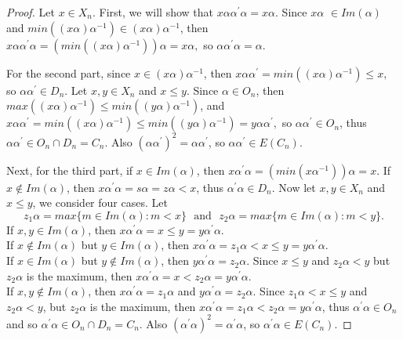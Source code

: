 \documentclass[10pt]{extarticle}
\numberwithin{equation}{section}
\numberwithin{bbb}{section}
\numberwithin{equation}{section}
\begin{document}
\begin{proof}
Let $x \in X_n$. First, we will show that $x\alpha\alpha^{\prime}\alpha=x\alpha$. Since $x\alpha$ $\in Im(\alpha)$ and $min((x\alpha)\alpha^{-1}) \in (x\alpha)\alpha^{-1}$, then
$x\alpha \alpha^{\prime}\alpha =(min((x\alpha)\alpha^{-1}))\alpha=x\alpha,$ so $\alpha \alpha^{\prime}\alpha=\alpha$.

\vspace{0.2cm}
For the second part, since $x \in (x\alpha)\alpha^{-1}$, then 
  $x\alpha \alpha^{\prime}=min((x\alpha)\alpha^{-1}) \leq x,$ so $\alpha \alpha^{\prime} \in D_n$. Let $x,y \in X_n$ and $x \leq y$. Since $\alpha \in O_n$, then $max((x\alpha)\alpha^{-1}) \leq min((y\alpha)\alpha^{-1})$,
  and $x\alpha \alpha^{\prime} =min((x\alpha)\alpha^{-1}) \leq min((y\alpha)\alpha^{-1})=y\alpha \alpha^{\prime},$
  so $\alpha\alpha^{\prime}\in O_n$, thus $\alpha\alpha^{\prime}\in O_n \cap D_n=C_n$.
  Also
$(\alpha\alpha^{\prime})^2=\alpha\alpha^{\prime}$, so $\alpha \alpha^{\prime} \in E(C_n)$.

\vspace{0.1cm}
Next, for the third part,
  if $x \in Im(\alpha)$, then $x \alpha^{\prime}\alpha=(min(x\alpha^{-1}))\alpha=x.$
  If $x \notin Im(\alpha)$, then 
  $x \alpha^{\prime}\alpha  =s\alpha=z\alpha<x$,
  thus $\alpha^{\prime}\alpha \in D_n$. Now let $x,y \in X_n$ and $x \leq y$, we consider four cases. Let
  $$ z_1\alpha=max\{m \in Im(\alpha): m<x\} \ \ \ \text{and} \ \ \ z_2\alpha=max\{m \in Im(\alpha): m<y\}.$$
  If $x,y \in Im(\alpha)$, then
  $x \alpha^{\prime}\alpha=x \leq y=y\alpha^{\prime}\alpha$.\\
  If $x \notin Im(\alpha)$ but $y \in Im(\alpha)$, then
  $x \alpha^{\prime}\alpha=z_1\alpha<x \leq y=y\alpha^{\prime}\alpha$.\\
  If $x \in Im(\alpha)$ but $y \notin Im(\alpha)$, then
  $y \alpha^{\prime}\alpha=z_2\alpha$. Since $x \leq y$ and $z_2\alpha<y$ but $z_2\alpha$ is the maximum, then $x \alpha^{\prime}\alpha=x<z_2\alpha=y \alpha^{\prime}\alpha$.\\
  If $x,y \notin Im(\alpha)$, then
$x \alpha^{\prime}\alpha=z_1\alpha$ and $y \alpha^{\prime}\alpha=z_2\alpha$. Since $z_1\alpha<x \leq y$ and $z_2\alpha<y$, but $z_2\alpha$ is the maximum, then $x \alpha^{\prime}\alpha=z_1\alpha<z_2\alpha=y \alpha^{\prime}\alpha$, thus $\alpha^{\prime}\alpha \in O_n$ and so $\alpha^{\prime}\alpha \in O_n \cap D_n=C_n$. Also
$(\alpha^{\prime}\alpha)^2=\alpha^{\prime}\alpha$, so $\alpha^{\prime}\alpha \in E(C_n)$.


\end{proof}
\end{document}
